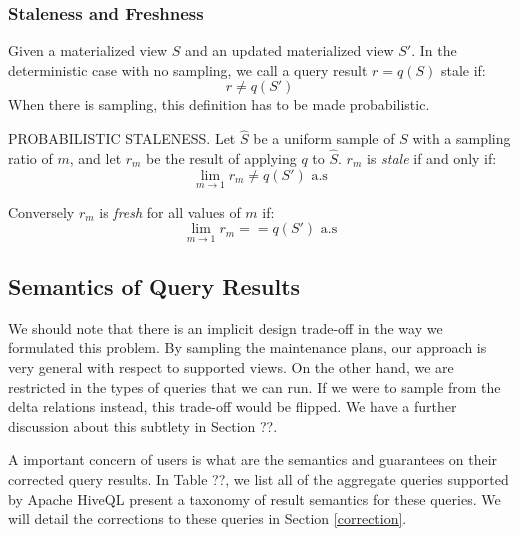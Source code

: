 \subsubsection{Staleness and Freshness}


Given a materialized view $S$ and an updated materialized view $S'$.
In the deterministic case with no sampling, we call a query result $r = q(S)$ stale if:
\[r \ne q(S')\]
When there is sampling, this definition has to be made probabilistic.



\begin{definition} PROBABILISTIC STALENESS.
Let $\hat{S}$ be a uniform sample of $S$ with a sampling ratio of $m$,
and let $r_m$ be the result of applying $q$ to $\hat{S}$.
$r_m$ is \emph{stale} if and only if:
\[\lim_{m\rightarrow 1} r_m \ne q(S') \text{  a.s}\]

Conversely $r_m$ is \emph{fresh} for all values of $m$ if:
\[\lim_{m\rightarrow 1} r_m == q(S') \text{  a.s}\]
\end{definition}

\subsection{Semantics of Query Results}
We should note that there is an implicit design trade-off in the way we formulated this problem.
By sampling the maintenance plans, our approach is very general with respect to supported views.
On the other hand, we are restricted in the types of queries that we can run.
If we were to sample from the delta relations instead, this trade-off would be flipped. 
We have a further discussion about this subtlety in Section ??.

A important concern of users is what are the semantics and guarantees on their corrected query results.
In Table ??, we list all of the aggregate queries supported by Apache HiveQL present a taxonomy of result semantics for these queries.
We will detail the corrections to these queries in Section \ref{correction}.
\fi